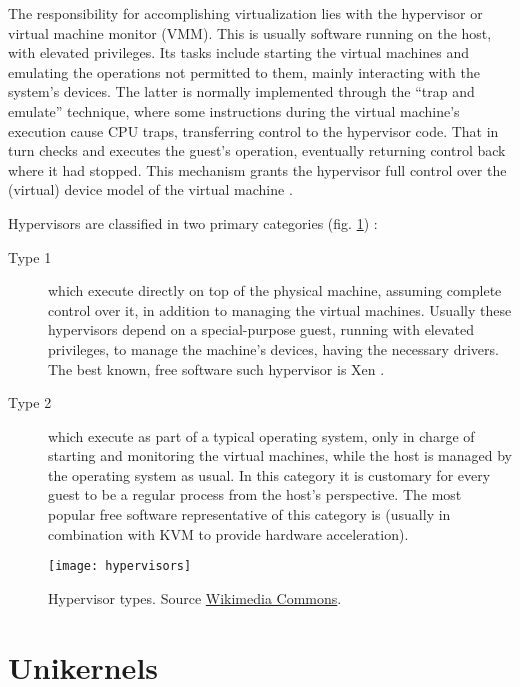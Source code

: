 The responsibility for accomplishing virtualization lies with the hypervisor or
virtual machine monitor (VMM). This is usually software running on the host,
with elevated privileges. Its tasks include starting the virtual machines and
emulating the operations not permitted to them, mainly interacting with the
system's devices. The latter is normally implemented through the ``trap and
emulate'' technique, where some instructions during the virtual machine's
execution cause CPU traps, transferring control to the hypervisor code. That
in turn checks and executes the guest's operation, eventually returning control
back where it had stopped. This mechanism grants the hypervisor full control
over the (virtual) device model of the virtual machine \cite{wiki:hypervisor}.

Hypervisors are classified in two primary categories (fig.
\ref{fig:hypervisors}) \cite{popek74}:
\begin{description}
    \item[Type 1] which execute directly on top of the physical machine,
          assuming complete control over it, in addition to managing the virtual
          machines. Usually these hypervisors depend on a special-purpose guest,
          running with elevated privileges, to manage the machine's devices,
          having the necessary drivers. The best known, free software such
          hypervisor is Xen \cite{xen}.
    \item[Type 2] which execute as part of a typical operating system, only in
          charge of starting and monitoring the virtual machines, while the host
          is managed by the operating system as usual. In this category it is
          customary for every guest to be a regular process from the host's
          perspective. The most popular free software representative of this
          category is \qemu{} \cite{qemu} (usually in combination with KVM
          \cite{kvm} to provide hardware acceleration).
\end{description}

\begin{figure}
    \centering
    \texttt{[image: hypervisors]}
    \caption[Hypervisor types]{Hypervisor types. Source
        \href{https://commons.wikimedia.org/wiki/File:Hyperviseur.png}{Wikimedia Commons}.}
    \label{fig:hypervisors}
\end{figure}

\section{Unikernels}

